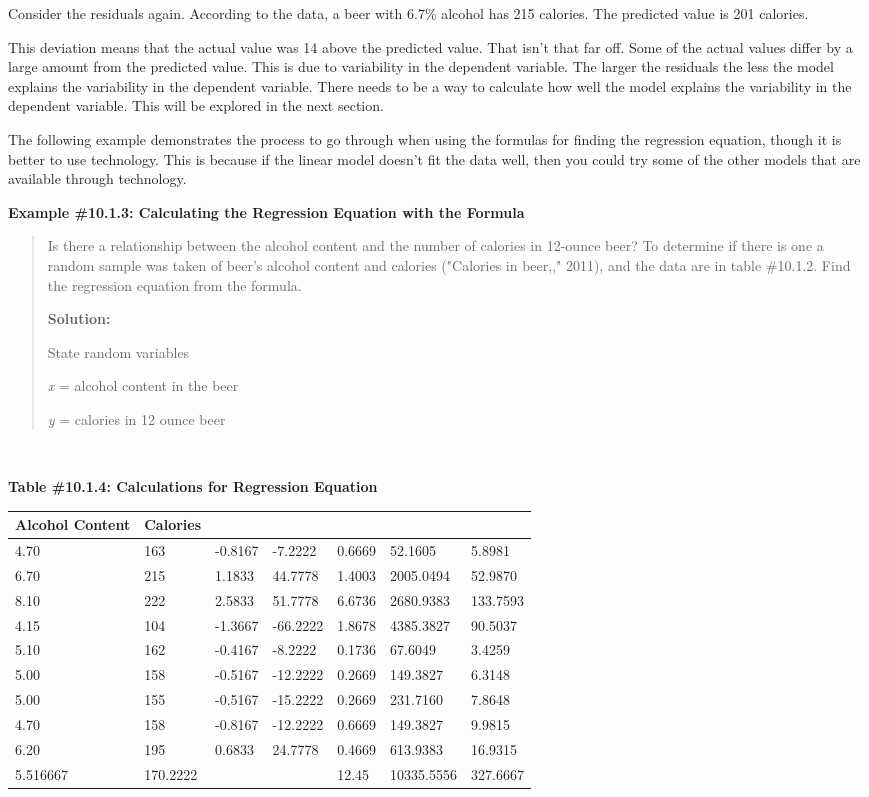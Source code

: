 \documentclass[]{book}
\begin{document}
Consider the residuals again. According to the data, a beer with 6.7\% alcohol has 215 calories. The predicted value is 201 calories.

This deviation means that the actual value was 14 above the predicted value. That isn't that far off. Some of the actual values differ by a large amount from the predicted value. This is due to variability in the dependent variable. The larger the residuals the less the model explains the variability in the dependent variable. There needs to be a way to calculate how well the model explains the variability in the dependent variable. This will be explored in the next section.

The following example demonstrates the process to go through when using the formulas for finding the regression equation, though it is better to use technology. This is because if the linear model doesn't fit the data well, then you could try some of the other models that are available through technology.

\textbf{Example \#10.1.3: Calculating the Regression Equation with the
Formula}

\begin{quote}
Is there a relationship between the alcohol content and the number of calories in 12-ounce beer? To determine if there is one a random sample was taken of beer's alcohol content and calories ("Calories in beer,," 2011), and the data are in table \#10.1.2. Find the regression equation from the formula.

\textbf{Solution:}

State random variables

\emph{x} = alcohol content in the beer

\emph{y} = calories in 12 ounce beer
\end{quote}

\textbf{\\
}

\textbf{Table \#10.1.4: Calculations for Regression Equation}

\begin{longtable}[]{@{}lllllll@{}}
\toprule
Alcohol Content & Calories & & & & &\tabularnewline
\midrule
\endhead
4.70 & 163 & -0.8167 & -7.2222 & 0.6669 & 52.1605 & 5.8981\tabularnewline
6.70 & 215 & 1.1833 & 44.7778 & 1.4003 & 2005.0494 & 52.9870\tabularnewline
8.10 & 222 & 2.5833 & 51.7778 & 6.6736 & 2680.9383 & 133.7593\tabularnewline
4.15 & 104 & -1.3667 & -66.2222 & 1.8678 & 4385.3827 & 90.5037\tabularnewline
5.10 & 162 & -0.4167 & -8.2222 & 0.1736 & 67.6049 & 3.4259\tabularnewline
5.00 & 158 & -0.5167 & -12.2222 & 0.2669 & 149.3827 & 6.3148\tabularnewline
5.00 & 155 & -0.5167 & -15.2222 & 0.2669 & 231.7160 & 7.8648\tabularnewline
4.70 & 158 & -0.8167 & -12.2222 & 0.6669 & 149.3827 & 9.9815\tabularnewline
6.20 & 195 & 0.6833 & 24.7778 & 0.4669 & 613.9383 & 16.9315\tabularnewline
5.516667 & 170.2222 & & & 12.45 & 10335.5556 & 327.6667\tabularnewline
\bottomrule
\end{longtable}
\end{document}
